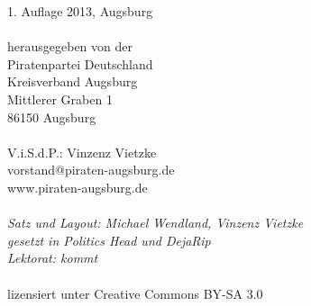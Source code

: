 \vspace*{\fill}
\begin{minipage}{\textwidth}
  \begin{small}
    \begin{singlespace}
       1. Auflage 2013, Augsburg\\
       \\
       herausgegeben von der\\
       Piratenpartei Deutschland\\
       Kreisverband Augsburg\\
       Mittlerer Graben 1\\
       86150 Augsburg\\
       \\
       V.i.S.d.P.: Vinzenz Vietzke\\
       vorstand@piraten-augsburg.de\\
       www.piraten-augsburg.de\\
       \\
       \textit{
         Satz und Layout: Michael Wendland, Vinzenz Vietzke\\
         gesetzt in Politics Head und DejaRip\\
         Lektorat: kommt
        }\\
        \\
        lizensiert unter Creative Commons BY-SA 3.0
    \end{singlespace}
  \end{small}
\end{minipage}

